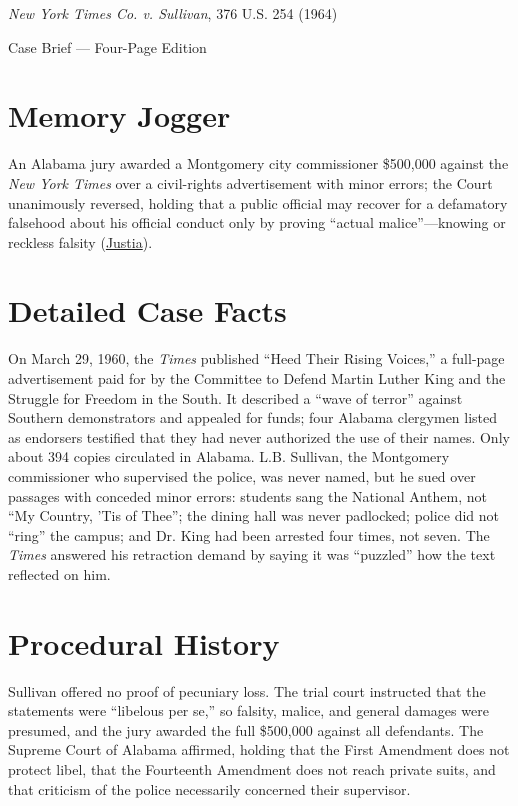 \documentclass[12pt]{article}
\begin{document}
\begin{center}
{\LARGE \textit{New York Times Co. v. Sullivan}, 376 U.S. 254 (1964)\par}
\vspace{0.8em}
{\large Case Brief --- Four-Page Edition\par}
\end{center}
\vspace{1em}

\section{Memory Jogger}

An Alabama jury awarded a Montgomery city commissioner \$500,000 against the \textit{New York Times} over a civil-rights advertisement with minor errors; the Court unanimously reversed, holding that a public official may recover for a defamatory falsehood about his official conduct only by proving ``actual malice''---knowing or reckless falsity (\href{https://supreme.justia.com/cases/federal/us/376/254/}{Justia}).

\section{Detailed Case Facts}

On March 29, 1960, the \textit{Times} published ``Heed Their Rising Voices,'' a full-page advertisement paid for by the Committee to Defend Martin Luther King and the Struggle for Freedom in the South. It described a ``wave of terror'' against Southern demonstrators and appealed for funds; four Alabama clergymen listed as endorsers testified that they had never authorized the use of their names. Only about 394 copies circulated in Alabama. L.B. Sullivan, the Montgomery commissioner who supervised the police, was never named, but he sued over passages with conceded minor errors: students sang the National Anthem, not ``My Country, 'Tis of Thee''; the dining hall was never padlocked; police did not ``ring'' the campus; and Dr. King had been arrested four times, not seven. The \textit{Times} answered his retraction demand by saying it was ``puzzled'' how the text reflected on him.

\section{Procedural History}

Sullivan offered no proof of pecuniary loss. The trial court instructed that the statements were ``libelous per se,'' so falsity, malice, and general damages were presumed, and the jury awarded the full \$500,000 against all defendants. The Supreme Court of Alabama affirmed, holding that the First Amendment does not protect libel, that the Fourteenth Amendment does not reach private suits, and that criticism of the police necessarily concerned their supervisor.
\end{document}
